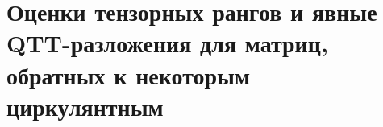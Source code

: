 \chapter{Оценки тензорных рангов и явные QTT-разложения для матриц, обратных к  некоторым циркулянтным}\label{ch:ch1}


